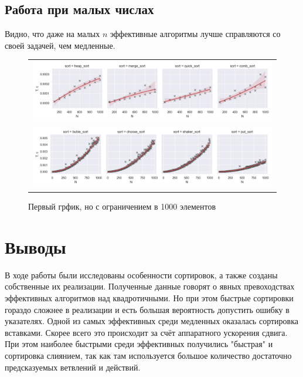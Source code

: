 \documentclass[12pt,a4paper]{article}
\begin{document}
\newpage
\subsection{Работа при малых числах}
Видно, что даже на малых $n$ эффективные алгоритмы лучше справляются со своей задачей, чем медленные.
\begin{figure}[!ht]
\begin{tabular}{c}
{\includegraphics[width=\textwidth]{imgs/compare_all_sm1.png}}\\
{\includegraphics[width=\textwidth]{imgs/compare_all_sm2.png}}
\end{tabular}
\caption{Первый грфик, но с ограничением в 1000 элементов}
\end{figure}

\newpage
\section{Выводы}
В ходе работы были исследованы особенности сортировок, а также созданы собственные их реализации. Полученные данные говорят о явных превоходствах эффективных алгоритмов над квадротичными. Но при этом быстрые сортировки гораздо сложнее в реализации и есть большая вероятность допустить ошибку в указателях. Одной из самых эффективных среди медленных оказалась сортировка вставками. Скорее всего это происходит за счёт аппаратного ускорения сдвига. При этом наиболее быстрыми среди эффективных получились "быстрая" и сортировка слиянием, так как там используется большое количество достаточно предсказуемых ветвлений и действий.
\end{document}
